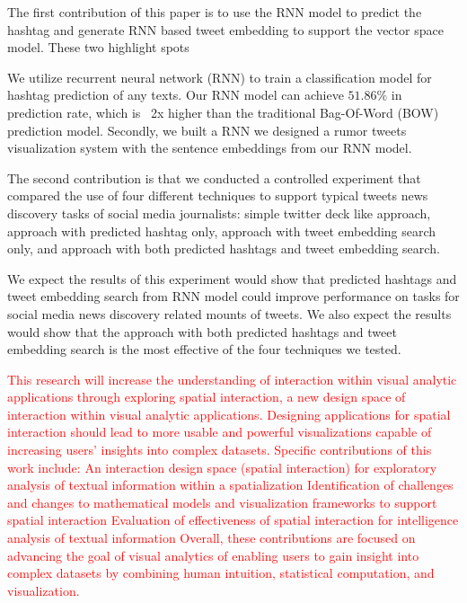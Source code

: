 The first contribution of this paper is to use the RNN model to predict the hashtag and generate RNN based tweet embedding to support the vector space model. These two highlight spots 

We utilize recurrent neural network (RNN) to train a classification model for hashtag prediction of any texts. Our RNN model can achieve $51.86\%$ in prediction rate, which is ~2x higher than the traditional Bag-Of-Word (BOW) prediction model. Secondly, we built a RNN we designed a rumor tweets visualization system with the sentence embeddings from our RNN model. 


The second contribution is that we conducted a controlled experiment that compared the use of four different techniques to support typical tweets news discovery tasks of social media journalists: simple twitter deck like approach,  approach with predicted hashtag only, approach with tweet embedding search only,  and approach with both predicted hashtags and tweet embedding search.

We expect the results of this experiment would show that predicted hashtags and tweet embedding search from RNN model could improve performance on tasks for social media news discovery related mounts of tweets. We also expect the results would show that the approach with both predicted hashtags and tweet embedding search is the most effective of the four techniques we tested.


\textcolor{red}{
This research will increase the understanding of interaction within visual analytic applications through exploring spatial interaction, a new design space of interaction within visual analytic applications. Designing applications for spatial interaction should lead to more usable and powerful visualizations capable of increasing users’ insights into complex datasets. Specific contributions of this work include:
An interaction design space (spatial interaction) for exploratory analysis of textual information within a spatialization 
Identification of challenges and changes to mathematical models and visualization frameworks to support spatial interaction 
Evaluation of effectiveness of spatial interaction for intelligence analysis of textual information
Overall, these contributions are focused on advancing the goal of visual analytics of enabling users to gain insight into complex datasets by combining human intuition, statistical computation, and visualization.
}












